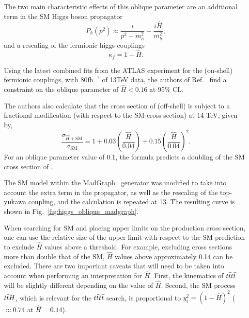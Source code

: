 The two main characteristic effects of this oblique parameter are
an additional term in the SM Higgs boson propagator
\begin{equation}
    P_h(p^2)\approx\frac{i}{p^2-m_h^2}-\frac{i\hat{H}}{m_h^2},
\end{equation}
and a rescaling of the fermionic higgs
couplings
\begin{equation}
    \kappa_f = 1-{\hat H}.
\end{equation}

Using the latest combined fits from the ATLAS experiment for the (on-shell) fermionic couplings,
with 80$\mathrm{fb}^{-1}$ of 13TeV data, the authors of Ref.~\cite{THEORY:ObliqueHiggs2019} find a constraint on
the oblique parameter of $\hat{H} < 0.16$ at 95\% CL.

The authors also calculate that the cross section of (off-shell) \tttt is subject to a fractional modification (with respect to the SM cross section)
at 14 TeV, given by,
\begin{equation}
    \frac{\sigma_{\hat{H}+\mathrm{SM}}}{\sigma_\mathrm{SM}} = 1 + 0.03\left(\frac{\hat{H}}{0.04}\right) + 0.15\left(\frac{\hat{H}}{0.04}\right)^2.
\end{equation}
For an oblique parameter value of 0.1, the formula predicts a doubling of the SM cross section of \tttt.

The SM model within the MadGraph~\cite{THEORY:MADGRAPH5} generator was modified to take into account the extra term in the propagator, as
well as the rescaling of the top-yukawa coupling, and the calculation is repeated
at 13\TeV. The resulting curve is shown in Fig.~\ref{fig:higgs_oblique_madgraph}.

When searching for SM \tttt and placing upper limits on the production cross
section, one can use the relative size of the upper limit with respect to
the SM prediction to exclude $\hat{H}$ values above a threshold. For example,
excluding cross sections more than double that of the SM, $\hat{H}$ values
above approximately 0.14 can be excluded. There are two important caveats
that will need to be taken into account when performing an interpretation for
$\hat{H}$. First, the kinematics of $t\bar{t}t\bar{t}$ will be slightly different
depending on the value of $\hat{H}$. Second, the SM process $t\bar{t}H$, which is
relevant for the $t\bar{t}t\bar{t}$ search, is proportional to
$y_\mathrm{t}^2=(1-\hat{H})^2$ ($\approx 0.74$ at $\hat{H}=0.14$).

